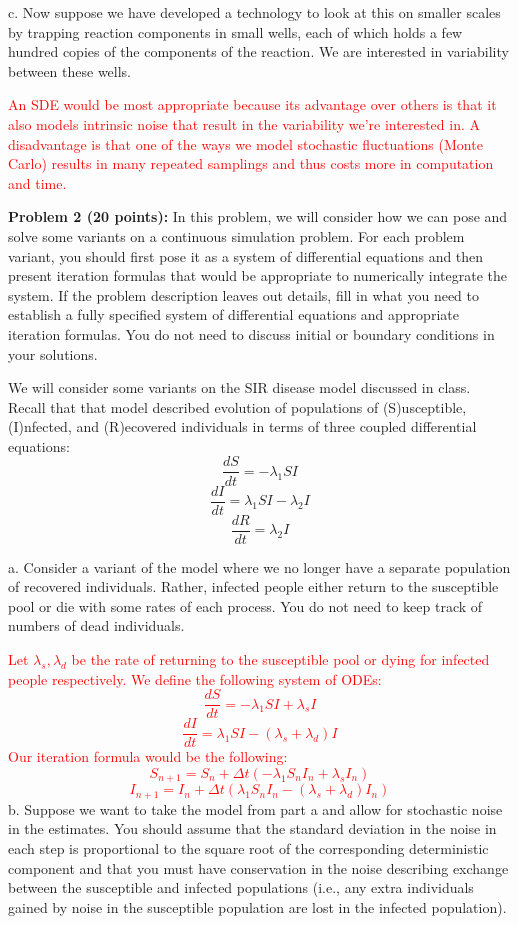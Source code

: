 \documentclass[11pt]{article}
\begin{document}
c. Now suppose we have developed a technology to look at this on smaller scales by trapping reaction components in small wells, each of which holds a few hundred copies of the components of the reaction.  We are interested in variability between these wells.

\textcolor{red}{
An SDE would be most appropriate because its advantage over others is that it also models intrinsic noise that result in the variability we're interested in. A disadvantage is that one of the ways we model stochastic fluctuations (Monte Carlo) results in many repeated samplings and thus costs more in computation and time.
}

{\bf Problem 2 (20 points):} In this problem, we will consider how we
can pose and solve some variants on a continuous simulation problem.
For each problem variant, you should first pose it as a system of
differential equations and then present iteration formulas that would
be appropriate to numerically integrate the system.  If the problem description leaves out details, fill in what you need to establish a fully specified system of differential equations and appropriate iteration formulas.  You do not need to discuss initial or boundary conditions in your solutions.

We will consider some variants on the SIR disease model discussed in class.  Recall that that model described evolution of populations of (S)usceptible, (I)nfected, and (R)ecovered individuals in terms of three coupled differential equations:
\[\frac{dS}{dt} = -\lambda_1 SI\]
\[\frac{dI}{dt} = \lambda_1 SI - \lambda_2 I\]
\[\frac{dR}{dt} = \lambda_2 I\]

a. Consider a variant of the model where we no longer have a separate population of recovered individuals.  Rather, infected people either return to the susceptible pool or die with some rates of each process.  You do not need to keep track of numbers of dead individuals.

\textcolor{red}{
Let $\lambda_s, \lambda_d$ be the rate of returning to the susceptible pool or dying for infected people respectively. We define the following system of ODEs:
\[\frac{dS}{dt} = -\lambda_1 S I + \lambda_s I\]
\[\frac{dI}{dt} = \lambda_1 S I - (\lambda_s + \lambda_d) I\]
Our iteration formula would be the following:
\[S_{n+1} = S_n + \Delta t \left(-\lambda_1 S_n I_n + \lambda_s I_n\right)\]
\[I_{n+1} = I_n + \Delta t \left(\lambda_1 S_n I_n - (\lambda_s + \lambda_d) I_n\right)\]
}
b. Suppose we want to take the model from part a and allow for stochastic noise in the estimates.  You should assume that the standard deviation in the noise in each step is proportional to the square root of the corresponding deterministic component and that you must have conservation in the noise describing exchange between the susceptible and infected populations (i.e., any extra individuals gained by noise in the susceptible population are lost in the infected population).
\end{document}
